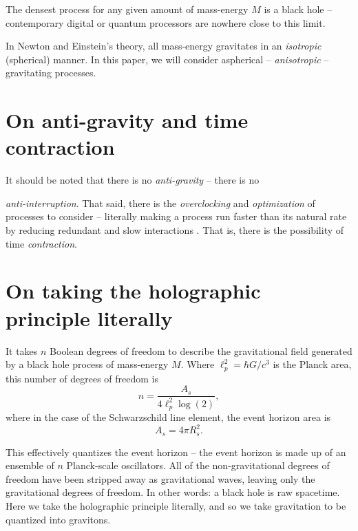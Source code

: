 \documentclass[12pt]{article}
\begin{document}
The densest process for any given amount of mass-energy $M$ is a black hole -- contemporary digital or quantum processors are nowhere close to this limit.

In Newton and Einstein's theory, all mass-energy gravitates in an {\textit{isotropic}} (spherical) manner.
In this paper, we will consider aspherical -- {\textit{anisotropic}} -- gravitating processes.







\section{On anti-gravity and time contraction}

It should be noted that there is no {\textit{anti-gravity}} -- there is no {\textit{anti-interruption}.
That said, there is the {\textit{overclocking}} and {\textit{optimization}} of processes to consider -- literally making a process run faster than its natural rate by reducing redundant and slow interactions \cite{wainner, mcconnell, pikus}.
That is, there is the possibility of time {\textit{contraction}}.





\section{On taking the holographic principle literally}

It takes $n$ Boolean degrees of freedom to describe the gravitational field \cite{hooft, susskind, bousso} generated by a black hole process of mass-energy $M$.
Where $\ell_p^2 = \hbar G / c^3$ is the Planck area, this number of degrees of freedom is
\begin{equation}
n = \frac{A_s}{4 \ell_p^2 \log(2)},
\end{equation}
where in the case of the Schwarzschild line element, the event horizon area is
\begin{equation}
A_s = 4 \pi R_s^2.
\end{equation}

This effectively quantizes the event horizon -- the event horizon is made up of an ensemble of $n$ Planck-scale oscillators.
All of the non-gravitational degrees of freedom have been stripped away as gravitational waves, leaving only the gravitational degrees of freedom.
In other words: a black hole is raw spacetime.
Here we take the holographic principle literally, and so we take gravitation to be quantized into gravitons.

}
\end{document}
